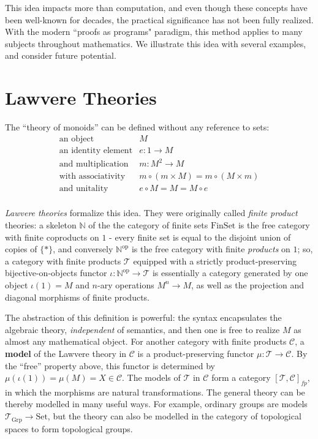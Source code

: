 \documentclass[a4paper,UKenglish]{article}
\theoremstyle{definition}
\newcommand{\Set}{\mathrm{Set}}
\newcommand{\Grp}{\mathrm{Grp}}
\newcommand{\FinSet}{\mathrm{FinSet}}
\newcommand{\op}{\mathrm{op}}
\newcommand{\NN}{\mathbb{N}}
\newcommand{\C}{\mathscr{C}}
\newcommand{\T}{\mathscr{T}}
\begin{document}
This idea impacts more than computation, and even though these concepts have been well-known for decades, the practical significance has not been fully realized. With the modern ``proofs as programs" paradigm, this method applies to many subjects throughout mathematics. We illustrate this idea with several examples, and consider future potential.

\section{Lawvere Theories}
The ``theory of monoids'' can be defined without any reference to sets:
\[\begin{array}{rl}
\text{an object} & M\\
\text{an identity element} & e:1 \to M\\
\text{and multiplication} & m: M^2 \to M\\
\text{with associativity} & m \circ (m \times M) = m \circ (M \times m)\\
\text{and unitality} & e \circ M = M = M \circ e\\
\end{array}\]

\textit{Lawvere theories} formalize this idea. They were originally called \textit{finite product} theories: a skeleton $\NN$ of the the category of finite sets $\FinSet$ is the free category with finite coproducts on $1$ - every finite set is equal to the disjoint union of copies of $\{*\}$, and conversely $\NN^\op$ is the free category with finite \textit{products} on $1$; so, a category with finite products $\T$ equipped with a strictly product-preserving bijective-on-objects functor $\iota:\NN^\op \to \T$ is essentially a category generated by one object $\iota(1) = M$ and $n$-ary operations $M^n \to M$, as well as the projection and diagonal morphisms of finite products.

The abstraction of this definition is powerful: the syntax encapsulates the algebraic theory, \textit{independent} of semantics, and then one is free to realize $M$ as almost any mathematical object. For another category with finite products $\C$, a \textbf{model} of the Lawvere theory in $\C$ is a product-preserving functor $\mu: \T \to \C$. By the ``free'' property above, this functor is determined by $\mu(\iota(1)) = \mu(M) = X \in \C$. The models of $\T$ in $\C$ form a category $[\T,\C]_{fp}$, in which the morphisms are natural transformations. The general theory can be thereby modelled in many useful ways. For example, ordinary groups are models $\T_\Grp \to \Set$, but the theory can also be modelled in the category of topological spaces to form topological groups.
\end{document}
